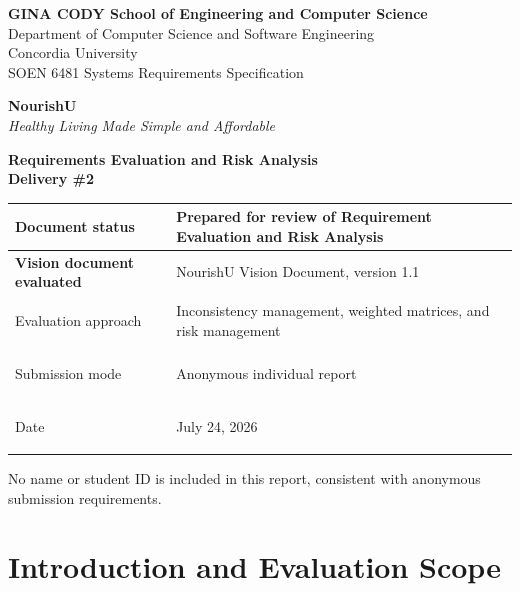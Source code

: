 \documentclass[11pt,a4paper]{article}
\renewcommand{\arraystretch}{1.15}
\begin{document}
\begin{titlepage}
\thispagestyle{empty}
\begin{center}
{\Large\bfseries GINA CODY School of Engineering and Computer Science\\[3pt]}
{\large Department of Computer Science and Software Engineering\\}
{\large Concordia University\\[12pt]}
{\large SOEN 6481 Systems Requirements Specification\\[28pt]}

{\Huge\bfseries\color{headingblue} NourishU\\[5pt]}
{\Large\itshape Healthy Living Made Simple and Affordable\\[28pt]}

{\LARGE\bfseries Requirements Evaluation and Risk Analysis\\[5pt]}
{\Large\bfseries Delivery \#2\\[28pt]}
\end{center}

\renewcommand{\arraystretch}{1.35}
\begin{tabularx}{\textwidth}{|>{\bfseries}p{4.2cm}|Y|}
\hline


Document status & Prepared for review of Requirement Evaluation and Risk Analysis \\ \hline

Vision document evaluated & NourishU Vision Document, version 1.1 \\ \hline

Evaluation approach & Inconsistency management, weighted matrices, and risk management \\ \hline

Submission mode & Anonymous individual report \\ \hline

Date & July 24, 2026 \\ \hline

\end{tabularx}
\vfill
\begin{center}
\small No name or student ID is included in this report, consistent with anonymous submission requirements.
\end{center}
\end{titlepage}

\tableofcontents
\clearpage

\section{Introduction and Evaluation Scope}
\end{document}
